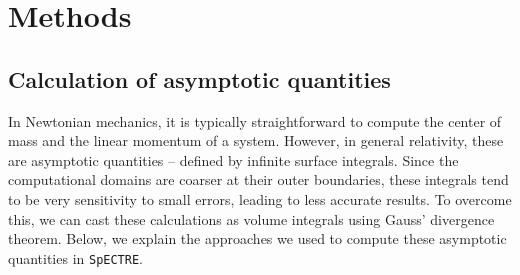 \documentclass{../document}
\begin{document}
    \begin{figure}
      \centering
      \caption{}
      \label{fig:free-data}
    \end{figure}


  \section{Methods}

    \subsection{Calculation of asymptotic quantities}

      In Newtonian mechanics, it is typically straightforward to compute the center of mass and the linear momentum of a system. However, in general relativity, these are asymptotic quantities -- defined by infinite surface integrals. Since the computational domains are coarser at their outer boundaries, these integrals tend to be very sensitivity to small errors, leading to less accurate results. To overcome this, we can cast these calculations as volume integrals using Gauss' divergence theorem. Below, we explain the approaches we used to compute these asymptotic quantities in {\tt SpECTRE}.
\end{document}
